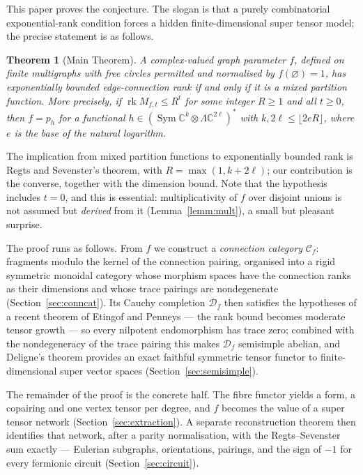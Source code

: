 \documentclass[11pt]{article}
\newtheorem{theo}{Theorem}[section]
\newcommand{\emptygraph}{\varnothing}
\newcommand{\connmat}[2]{M_{#1,#2}}               %
\newcommand{\conncat}{\mathcal{C}_{f}}            %
\newcommand{\cauchy}{\mathcal{D}_{f}}             %
\newcommand{\rk}{\operatorname{rk}}
\newcommand{\SymV}{\operatorname{Sym}}
\begin{document}
This paper proves the conjecture. The slogan is that a purely
combinatorial exponential-rank condition forces a hidden
finite-dimensional super tensor model; the precise statement is
as follows.

\begin{theo}[Main Theorem]\label{theo:main}
A complex-valued graph parameter $f$, defined on finite multigraphs
with free circles permitted and normalised by $f(\emptygraph)=1$, has
exponentially bounded edge-connection rank if and only if it is a
mixed partition function. More precisely, if
$\rk \connmat{f}{t}\le R^{t}$ for some integer $R\ge 1$ and all
$t\ge 0$, then $f=p_{h}$ for a functional
$h\in(\SymV\mathbb{C}^{k}\otimes\Lambda\mathbb{C}^{2\ell})^{*}$
with $k,2\ell\le\lfloor 2eR\rfloor$, where $e$ is the base of the
natural logarithm.
\end{theo}

The implication from mixed partition functions to exponentially
bounded rank is Regts and Sevenster's theorem, with
$R=\max(1,k+2\ell)$; our contribution is the converse, together
with the dimension bound. Note that the hypothesis includes $t=0$, and
this is essential: multiplicativity of $f$ over disjoint unions
is not assumed but \emph{derived} from it
(Lemma~\ref{lemm:mult}), a small but pleasant surprise.

The proof runs as follows. From $f$ we construct a
\emph{connection category} $\conncat$: fragments modulo the
kernel of the connection pairing, organised into a rigid
symmetric monoidal category whose morphism spaces have the
connection ranks as their dimensions and whose trace pairings
are nondegenerate (Section~\ref{sec:conncat}). Its Cauchy
completion $\cauchy$ then satisfies the hypotheses of a recent
theorem of Etingof and Penneys \cite{EP26} --- the rank bound
becomes moderate tensor growth --- so every nilpotent
endomorphism has trace zero; combined with the nondegeneracy of
the trace pairing this makes $\cauchy$ semisimple abelian, and
Deligne's theorem \cite{Del02} provides an exact faithful
symmetric tensor functor to finite-dimensional super vector
spaces (Section~\ref{sec:semisimple}).

The remainder of the proof is the concrete half. The fibre
functor yields a form, a copairing and one vertex tensor per
degree, and $f$ becomes the value of a super tensor network
(Section~\ref{sec:extraction}). A separate reconstruction theorem
then identifies that network, after a parity normalisation, with
the Regts--Sevenster sum exactly --- Eulerian subgraphs,
orientations, pairings, and the sign of $-1$ for every fermionic
circuit (Section~\ref{sec:circuit}).
\end{document}
